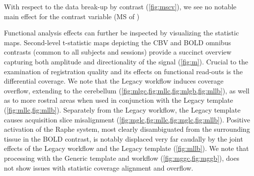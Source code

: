 With respect to the data break-up by contrast (\cref{fig:mscv}), we see no notable main effect for the contrast variable
(MS of )

Functional analysis effects can further be inspected by visualizing the statistic maps.
Second-level t-statistic maps depicting the CBV and BOLD omnibus contrasts (common to all subjects and sessions) provide a succinct overview capturing both amplitude and directionality of the signal (\cref{fig:m}).
Crucial to the examination of registration quality and its effects on functional read-outs is the differential coverage.
We note that the Legacy workflow induces coverage overflow, extending to the cerebellum (\cref{fig:mlgc,fig:mllc,fig:mlgb,fig:mllb}), as well as to more rostral areas when used in conjunction with the Legacy template (\cref{fig:mllc,fig:mllb}).
Separately from the Legacy workflow, the Legacy template causes acquisition slice misalignment (\cref{fig:mglc,fig:mllc,fig:mglc,fig:mllb}).
Positive activation of the Raphe system, most clearly disambiguated from the surrounding tissue in the BOLD contrast, is notably displaced very far caudally by the joint effects of the Legacy workflow and the Legacy template (\cref{fig:mllb}).
We note that processing with the Generic template and workflow (\cref{fig:mggc,fig:mggb}), does not show issues with statistic coverage alignment and overflow.


